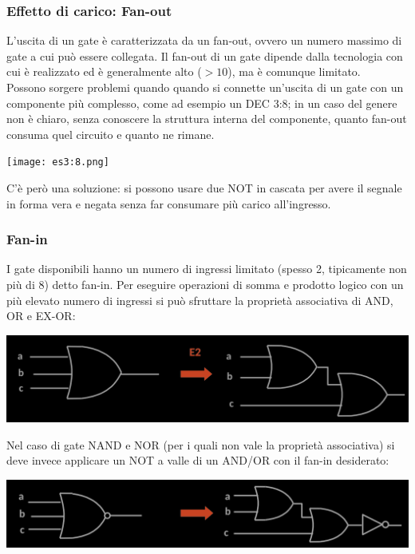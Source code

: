 \documentclass{article}
\begin{document}
\subsubsection{Effetto di carico: Fan-out}
L'uscita di un gate è caratterizzata da un fan-out, ovvero un numero massimo di gate a cui può essere collegata. Il fan-out di un gate dipende dalla tecnologia con cui è realizzato ed è generalmente alto ($>10$), ma è comunque limitato. 
\vspace{0.3cm}\\
Possono sorgere problemi quando quando si connette un'uscita di un gate con un componente più complesso, come ad esempio un DEC 3:8; in un caso del genere non è chiaro, senza conoscere la struttura interna del componente, quanto fan-out consuma quel circuito e quanto ne rimane.
\begin{center}
    \texttt{[image: es3:8.png]}
\end{center}
C'è però una soluzione: si possono usare due NOT in cascata per avere il segnale in forma vera e negata senza far consumare più carico all'ingresso.
\subsubsection{Fan-in}
I gate disponibili hanno un numero di ingressi limitato (spesso 2, tipicamente non più di 8) detto fan-in. Per eseguire operazioni di somma e prodotto logico con un più elevato numero di ingressi si può sfruttare la proprietà associativa di AND, OR e EX-OR:
\begin{center}
    \includegraphics[scale=0.5]{fan-in1.png}
\end{center}
Nel caso di gate NAND e NOR (per i quali non vale la proprietà associativa) si deve invece applicare un NOT a valle di un AND/OR con il fan-in desiderato:
\begin{center}
    \includegraphics[scale=0.5]{fan-in2.png}
\end{center}
\end{document}
